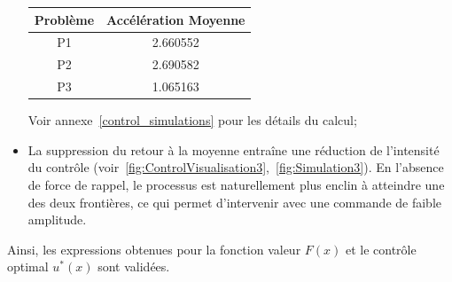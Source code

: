 \begin{itemize}
\begin{table}[htb]
\begin{tabular}{||c|c||}
        \hline
        Problème & Accélération Moyenne \\\hline\hline
        P1 & 2.660552 \\
        P2 & 2.690582 \\
        P3 & 1.065163 \\\hline
        \end{tabular}
    \end{table}\FloatBarrier Voir annexe~\ref{control_simulations} pour les détails du calcul; 
    \item La suppression du retour à la moyenne entraîne une réduction de l'intensité du contrôle (voir~\ref{fig:ControlVisualisation3},~\ref{fig:Simulation3}). En l'absence de force de rappel, le processus est naturellement plus enclin à atteindre une des deux frontières, ce qui permet d'intervenir avec une commande de faible amplitude.
\end{itemize}
Ainsi, les expressions obtenues pour la fonction valeur $F(x)$ et le contrôle optimal $u^*(x)$ sont validées.
